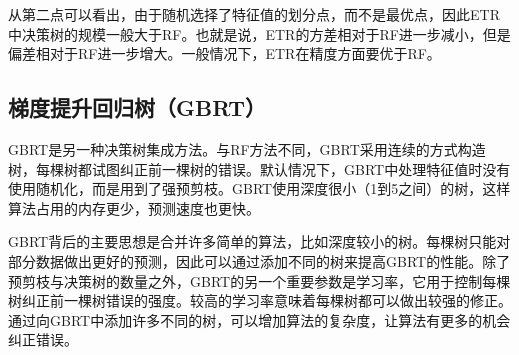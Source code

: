 从第二点可以看出，由于随机选择了特征值的划分点，而不是最优点，因此ETR中决策树的规模一般大于RF。也就是说，ETR的方差相对于RF进一步减小，但是偏差相对于RF进一步增大。一般情况下，ETR在精度方面要优于RF。

\subsection{梯度提升回归树（GBRT）}\label{sec:ml_gbr}

GBRT是另一种决策树集成方法。与RF方法不同，GBRT采用连续的方式构造树，每棵树都试图纠正前一棵树的错误。默认情况下，GBRT中处理特征值时没有使用随机化，而是用到了强预剪枝。GBRT使用深度很小（1到5之间）的树，这样算法占用的内存更少，预测速度也更快。

GBRT背后的主要思想是合并许多简单的算法，比如深度较小的树。每棵树只能对部分数据做出更好的预测，因此可以通过添加不同的树来提高GBRT的性能。除了预剪枝与决策树的数量之外，GBRT的另一个重要参数是学习率，它用于控制每棵树纠正前一棵树错误的强度。较高的学习率意味着每棵树都可以做出较强的修正。通过向GBRT中添加许多不同的树，可以增加算法的复杂度，让算法有更多的机会纠正错误。




